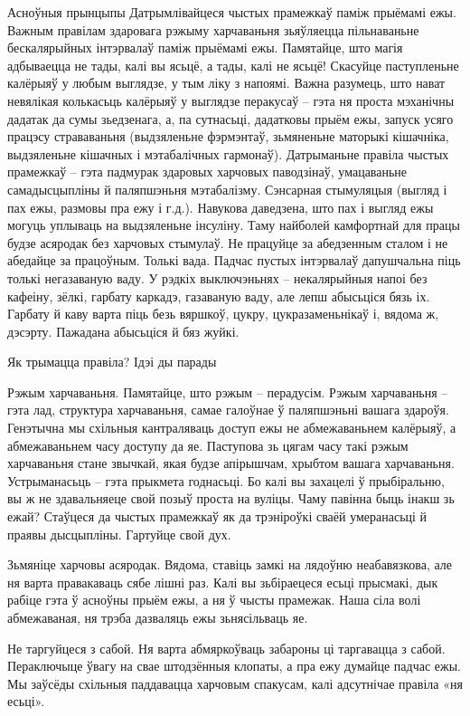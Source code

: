 Асноўныя прынцыпы
Датрымлівайцеся чыстых прамежкаў паміж прыёмамі ежы.
Важным правілам здаровага рэжыму харчаваньня зьяўляецца пільнаваньне бескалярыйных інтэрвалаў паміж прыёмамі ежы. Памятайце, што магія адбываецца не тады, калі вы ясьцё, а тады, калі не ясьцё! Скасуйце паступленьне калёрыяў у любым выглядзе, у тым ліку з напоямі.
Важна разумець, што нават невялікая колькасьць калёрыяў у выглядзе перакусаў – гэта ня проста мэханічны дадатак да сумы зьедзенага, а, па сутнасьці, дадатковы прыём ежы, запуск усяго працэсу страваваньня (выдзяленьне фэрмэнтаў, зьмяненьне маторыкі кішачніка, выдзяленьне кішачных і мэтабалічных гармонаў). Датрыманьне правіла чыстых прамежкаў – гэта падмурак здаровых харчовых паводзінаў, умацаваньне самадысцыпліны й паляпшэньня мэтабалізму.
Сэнсарная стымуляцыя (выгляд і пах ежы, размовы пра ежу і г.д.). 
Навукова даведзена, што пах і выгляд ежы могуць уплываць на выдзяленьне інсуліну. Таму найболей камфортнай для працы будзе асяродак без харчовых стымулаў. Не працуйце за абедзенным сталом і не абедайце за працоўным.
Толькі вада.
Падчас пустых інтэрвалаў дапушчальна піць толькі негазаваную ваду. У рэдкіх выключэньнях – некалярыйныя напоі без кафеіну, зёлкі, гарбату каркадэ, газаваную ваду, але лепш абысьціся бязь іх. Гарбату й каву варта піць безь вяршкоў, цукру, цукразаменьнікаў і, вядома ж, дэсэрту. Пажадана абысьціся й бяз жуйкі.

Як трымацца правіла? Ідэі ды парады

Рэжым харчаваньня.
Памятайце, што рэжым – перадусім. Рэжым харчаваньня – гэта лад, структура харчаваньня, самае галоўнае ў паляпшэньні вашага здароўя. Генэтычна мы схільныя кантраляваць доступ ежы не абмежаваньнем калёрыяў, а абмежаваньнем часу доступу да яе. Паступова зь цягам часу такі рэжым харчаваньня стане звычкай, якая будзе апірышчам, хрыбтом вашага харчаваньня.
Устрыманасьць – гэта прыкмета годнасьці. 
Бо калі вы захацелі ў прыбіральню, вы ж не здавальняеце свой позыў проста на вуліцы. Чаму павінна быць інакш зь ежай? Стаўцеся да чыстых прамежкаў як да трэніроўкі сваёй умеранасьці й праявы дысцыпліны. Гартуйце свой дух.

Зьмяніце харчовы асяродак. 
Вядома, ставіць замкі на лядоўню неабавязкова, але ня варта правакаваць сябе лішні раз. Калі вы зьбіраецеся есьці прысмакі, дык рабіце гэта ў асноўны прыём ежы, а ня ў чысты прамежак. Наша сіла волі абмежаваная, ня трэба дазваляць ежы зьнясільваць яе.

Не таргуйцеся з сабой. 
Ня варта абмяркоўваць забароны ці таргавацца з сабой. Пераключыце ўвагу на свае штодзённыя клопаты, а пра ежу думайце падчас ежы. Мы заўсёды схільныя паддавацца харчовым спакусам, калі адсутнічае правіла «ня есьці».

